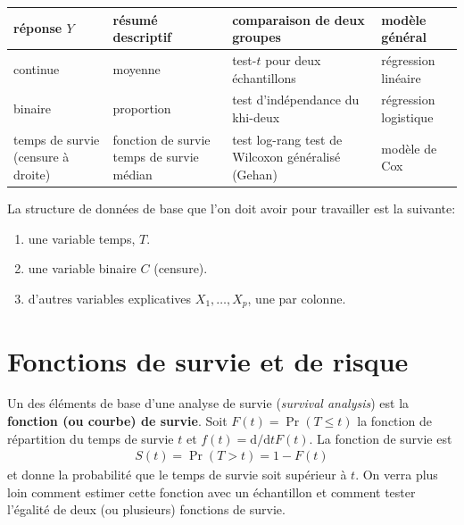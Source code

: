 \documentclass[
  11pt,
  letterpaper,
]{scrbook}
\providecommand{\tightlist}{%
  \setlength{\itemsep}{0pt}\setlength{\parskip}{0pt}}\usepackage{longtable,booktabs,array}
\theoremstyle{definition}
\theoremstyle{remark}
\begin{document}
\begin{longtable}[]{@{}
  >{\raggedright\arraybackslash}p{}
  >{\raggedright\arraybackslash}p{}
  >{\raggedright\arraybackslash}p{}
  >{\raggedright\arraybackslash}p{}@{}}
\toprule\noalign{}
\begin{minipage}[b]{\linewidth}\raggedright
réponse \(Y\)
\end{minipage} & \begin{minipage}[b]{\linewidth}\raggedright
résumé descriptif
\end{minipage} & \begin{minipage}[b]{\linewidth}\raggedright
comparaison de deux groupes
\end{minipage} & \begin{minipage}[b]{\linewidth}\raggedright
modèle général
\end{minipage} \\
\midrule\noalign{}
\endhead
\bottomrule\noalign{}
\endlastfoot
continue & moyenne & test-\(t\) pour deux échantillons & régression
linéaire \\
binaire & proportion & test d'indépendance du khi-deux & régression
logistique \\
temps de survie (censure à droite) & fonction de survie temps de survie
médian & test log-rang test de Wilcoxon généralisé (Gehan) & modèle de
Cox \\
\end{longtable}

La structure de données de base que l'on doit avoir pour travailler est
la suivante:

\begin{enumerate}
\def\labelenumi{\arabic{enumi})}
\tightlist
\item
  une variable temps, \(T\).
\item
  une variable binaire \(C\) (censure).
\item
  d'autres variables explicatives \(X_1, \ldots, X_p\), une par colonne.
\end{enumerate}

\section{Fonctions de survie et de
risque}\label{fonctions-de-survie-et-de-risque}

Un des éléments de base d'une analyse de survie (\emph{survival
analysis}) est la \textbf{fonction (ou courbe) de survie}. Soit
\(F(t)=\Pr(T \leq t)\) la fonction de répartition du temps de survie
\(t\) et \(f(t) = \mathrm{d} / \mathrm{d} t F(t)\). La fonction de
survie est \begin{align*}
S(t)= \Pr(T > t) = 1-F(t)
\end{align*} et donne la probabilité que le temps de survie soit
supérieur à \(t\). On verra plus loin comment estimer cette fonction
avec un échantillon et comment tester l'égalité de deux (ou plusieurs)
fonctions de survie.
\end{document}
